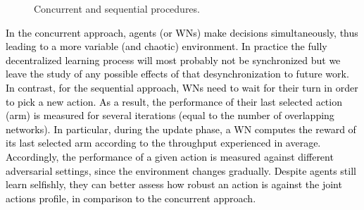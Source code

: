 \documentclass{article}
\begin{document}
	\begin{figure}[h!]
		\centering				
		\caption{Concurrent and sequential procedures.}
		\label{fig:async_vs_sync}
	\end{figure}
	
	\textcolor{black}{In the concurrent approach, agents (or WNs) make decisions simultaneously, thus leading to a more variable (and chaotic) environment. In practice the fully decentralized learning process will most probably not be synchronized but we leave the study of any possible effects of that desynchronization to future work. In contrast, \textcolor{black}{for the sequential approach, WNs need to wait for their turn in order to pick a new action. As a result, the performance of their last selected action (arm) is measured for several iterations (equal to the number of overlapping networks). In particular, during the update phase, a WN computes the reward of its last selected arm according to the throughput experienced in average. Accordingly, the performance of a given action is measured against different adversarial settings, since the environment changes gradually. Despite agents still learn selfishly, they can better assess how robust an action is against the joint actions profile, in comparison to the concurrent approach.}} 
	
\end{document}

